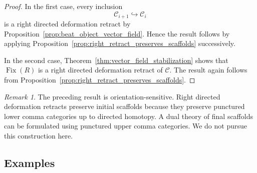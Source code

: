 \documentclass[12pt]{amsart}
\theoremstyle{definition}
\theoremstyle{remark}
\newtheorem{remark}[teo]{Remark}
\numberwithin{figure}{section}%
\newcommand{\CC}{\mathcal{C}}
\begin{document}
\begin{proof}
In the first case, every inclusion
\[
\CC_{i+1}\hookrightarrow\CC_i
\]
is a right directed deformation retract by
Proposition~\ref{prop:beat_object_vector_field}. Hence the result follows
by applying
Proposition~\ref{prop:right_retract_preserves_scaffolds}
successively.

In the second case,
Theorem~\ref{thm:vector_field_stabilization} shows that
\(\operatorname{Fix}(R)\) is a right directed deformation retract of
\(\CC\). The result again follows from
Proposition~\ref{prop:right_retract_preserves_scaffolds}.
\end{proof}
\begin{remark}
The preceding result is orientation-sensitive. Right directed deformation retracts preserve initial scaffolds because they preserve punctured lower comma categories up to directed homotopy. A dual theory of final scaffolds can be formulated using punctured upper comma categories. We do not pursue this construction here.
\end{remark}

\subsection{Examples}
\end{document}
